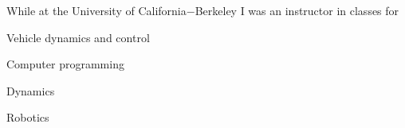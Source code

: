 %
While at the University of California$-$Berkeley I was an instructor in classes for
%
\begin{innerlist}
    \item Vehicle dynamics and control
    \item Computer programming
    \item Dynamics
    \item Robotics
\end{innerlist}
%
%
